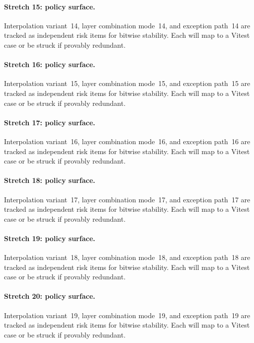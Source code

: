 \documentclass[sigconf,nonacm]{acmart}
\begin{document}
\paragraph{Stretch 15: policy surface.}
Interpolation variant~14, layer combination mode~14, and exception path~14 are tracked as independent risk items for bitwise stability. Each will map to a Vitest case or be struck if provably redundant. %

\paragraph{Stretch 16: policy surface.}
Interpolation variant~15, layer combination mode~15, and exception path~15 are tracked as independent risk items for bitwise stability. Each will map to a Vitest case or be struck if provably redundant. %

\paragraph{Stretch 17: policy surface.}
Interpolation variant~16, layer combination mode~16, and exception path~16 are tracked as independent risk items for bitwise stability. Each will map to a Vitest case or be struck if provably redundant. %

\paragraph{Stretch 18: policy surface.}
Interpolation variant~17, layer combination mode~17, and exception path~17 are tracked as independent risk items for bitwise stability. Each will map to a Vitest case or be struck if provably redundant. %

\paragraph{Stretch 19: policy surface.}
Interpolation variant~18, layer combination mode~18, and exception path~18 are tracked as independent risk items for bitwise stability. Each will map to a Vitest case or be struck if provably redundant. %

\paragraph{Stretch 20: policy surface.}
Interpolation variant~19, layer combination mode~19, and exception path~19 are tracked as independent risk items for bitwise stability. Each will map to a Vitest case or be struck if provably redundant. %
\end{document}
